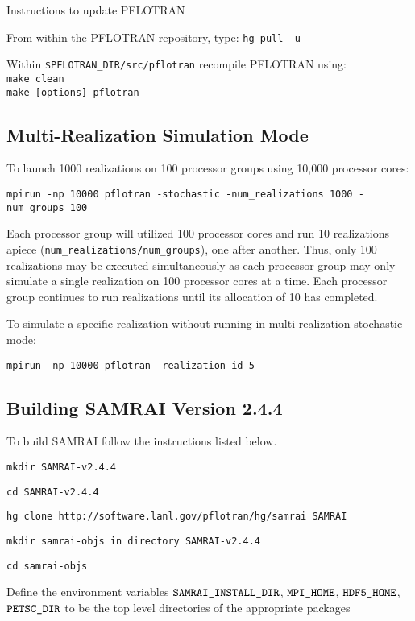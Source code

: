 \documentclass[12pt]{article}
\begin{document}
Instructions to update PFLOTRAN

\noindent
From within the PFLOTRAN repository, type: {\tt hg pull -u}

\noindent
Within {\tt \$PFLOTRAN\_DIR/src/pflotran} recompile PFLOTRAN using:\\
{\tt make clean}\\
{\tt make [options] pflotran}

\subsection*{Multi-Realization Simulation Mode}

To launch 1000 realizations on 100 processor groups using 10,000 processor cores:

{\tt mpirun -np 10000 pflotran -stochastic -num\_realizations 1000 -num\_groups 100}

Each processor group will utilized 100 processor cores and run 10 realizations apiece \linebreak ({\tt num\_realizations/num\_groups}), one after another. Thus, only 100 realizations may be executed simultaneously as each processor group may only simulate a single realization on 100 processor cores at a time. Each processor group continues to run realizations until its allocation of 10 has completed.

\noindent
To simulate a specific realization without running in multi-realization stochastic mode:

{\tt mpirun -np 10000 pflotran -realization\_id 5}

\subsection{Building SAMRAI Version 2.4.4}

\noindent
To build SAMRAI follow the instructions listed below.

{\tt mkdir SAMRAI-v2.4.4}

{\tt cd SAMRAI-v2.4.4}

{\tt hg clone http://software.lanl.gov/pflotran/hg/samrai SAMRAI}

{\tt mkdir samrai-objs in directory SAMRAI-v2.4.4}

{\tt cd samrai-objs}

Define the environment variables $\verb|SAMRAI_INSTALL_DIR|$, $\verb|MPI_HOME|$, $\verb|HDF5_HOME|$, \linebreak $\verb|PETSC_DIR|$ to be the top level directories of the appropriate packages
\end{document}
